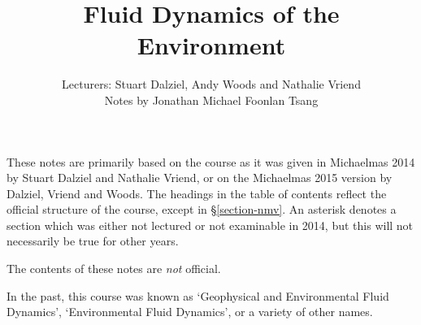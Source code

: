 \documentclass{book}
\title{Fluid Dynamics of the Environment}
\author{
    Lecturers: Stuart Dalziel, Andy Woods and Nathalie Vriend \\ 
Notes by Jonathan Michael Foonlan Tsang}
\numberwithin{equation}{section}
\begin{document}
\maketitle

These notes are primarily based on the course as it was given in Michaelmas 2014
by Stuart Dalziel and Nathalie Vriend, or on the Michaelmas 2015 version by
Dalziel, Vriend and Woods. The headings in the table of contents reflect
the official structure of the course, except in \S\ref{section-nmv}. An asterisk
denotes a section which was either not lectured or not examinable in 2014, but
this will not necessarily be true for other years. 

The contents of these notes are \textit{not} official.

In the past, this course was known as `Geophysical and Environmental Fluid
Dynamics', `Environmental Fluid Dynamics', or a variety of other names.

\tableofcontents









%





\end{document}
